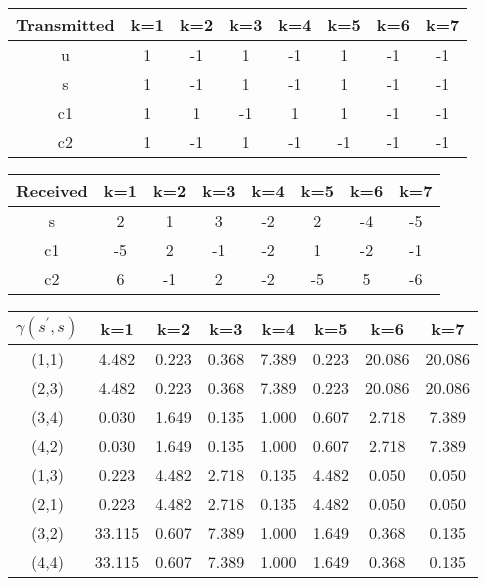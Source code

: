\documentclass{article}
\begin{document}
\begin{table}
	\begin{tabular}{|c|c|c|c|c|c|c|c|}
		\hline
		Transmitted & k=1 & k=2 & k=3 & k=4 & k=5 & k=6 & k=7 \\
		\hline
		u & 1 & -1 & 1 & -1 & 1 & -1 & -1 \\
		\hline
		s & 1 & -1 & 1 & -1 & 1 & -1 & -1 \\
		\hline
		c1 & 1 & 1 & -1 & 1 & 1 & -1 & -1 \\
		\hline
		c2 & 1 & -1 & 1 & -1 & -1 & -1 & -1 \\
		\hline
	\end{tabular}
\end{table}

\begin{table}
	\begin{tabular}{|c|c|c|c|c|c|c|c|}
		\hline
		Received & k=1 & k=2 & k=3 & k=4 & k=5 & k=6 & k=7 \\
		\hline
		s & 2 & 1 & 3 & -2 & 2 & -4 & -5 \\
		\hline
		c1 & -5 & 2 & -1 & -2 & 1 & -2 & -1 \\
		\hline
		c2 & 6 & -1 & 2 & -2 & -5 & 5 & -6 \\
		\hline
	\end{tabular}
\end{table}

\begin{table}
	\begin{tabular}{|c|c|c|c|c|c|c|c|}
		\hline
		$\gamma(s^{'},s)$ & k=1 & k=2 & k=3 & k=4 & k=5 & k=6 & k=7 \\
		\hline
		(1,1) & 4.482 & 0.223 & 0.368 & 7.389 & 0.223 & 20.086 & 20.086 \\
		\hline
		(2,3) & 4.482 & 0.223 & 0.368 & 7.389 & 0.223 & 20.086 & 20.086 \\
		\hline
		(3,4) & 0.030 & 1.649 & 0.135 & 1.000 & 0.607 & 2.718 & 7.389 \\
		\hline
		(4,2) & 0.030 & 1.649 & 0.135 & 1.000 & 0.607 & 2.718 & 7.389 \\
		\hline
		(1,3) & 0.223 & 4.482 & 2.718 & 0.135 & 4.482 & 0.050 & 0.050 \\
		\hline
		(2,1) &	0.223 & 4.482 & 2.718 & 0.135 & 4.482 & 0.050 & 0.050 \\
		\hline
		(3,2) & 33.115 & 0.607 & 7.389 & 1.000 & 1.649 & 0.368 & 0.135 \\ 
		\hline
		(4,4) & 33.115 & 0.607 & 7.389 & 1.000 & 1.649 & 0.368 & 0.135 \\ 
		\hline
	\end{tabular}
\end{table}
\end{document}
